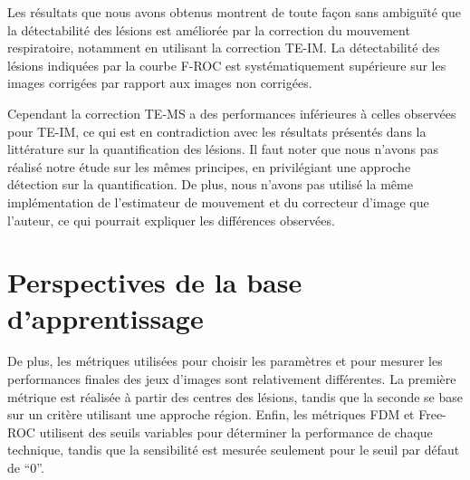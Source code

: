 Les résultats que nous avons obtenus montrent de toute façon sans ambiguïté que la détectabilité des lésions est améliorée par la correction du mouvement respiratoire, notamment en utilisant la correction TE-IM. La détectabilité des lésions indiquées par la courbe F-ROC est systématiquement supérieure sur les images corrigées par rapport aux images non corrigées.

Cependant la correction TE-MS a des performances inférieures à celles observées pour TE-IM, ce qui est en contradiction avec les résultats présentés dans la littérature sur la quantification des lésions. Il faut noter que nous n'avons pas réalisé notre étude sur les mêmes principes, en privilégiant une approche détection sur la quantification. De plus, nous n'avons pas utilisé la même implémentation de l'estimateur de mouvement et du correcteur d'image que l'auteur, ce qui pourrait expliquer les différences observées.


% 
% 
% 

\section{Perspectives de la base d'apprentissage}


De plus, les métriques utilisées pour choisir les paramètres et pour mesurer les performances finales des jeux d'images sont relativement différentes. La première métrique est réalisée à partir des centres des lésions, tandis que la seconde se base sur un critère utilisant une approche région. Enfin, les métriques FDM et Free-ROC utilisent des seuils variables pour déterminer la performance de chaque technique, tandis que la sensibilité est mesurée seulement pour le seuil par défaut de ``0''.

